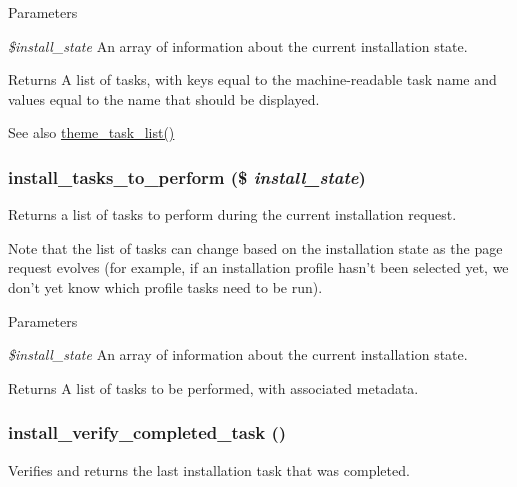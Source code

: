 \begin{DoxyParams}{Parameters}
\item[{\em \$install\_\-state}]An array of information about the current installation state.\end{DoxyParams}
\begin{DoxyReturn}{Returns}
A list of tasks, with keys equal to the machine-\/readable task name and values equal to the name that should be displayed.
\end{DoxyReturn}
\begin{DoxySeeAlso}{See also}
\hyperlink{group__themeable_gacac34ad88b724d01c7ca68f7891f64db}{theme\_\-task\_\-list()} 
\end{DoxySeeAlso}
\hypertarget{install_8core_8inc_a02b255f3c91fa330972d77e41c0b26c4}{
\subsubsection[{install\_\-tasks\_\-to\_\-perform}]{\setlength{\rightskip}{0pt plus 5cm}install\_\-tasks\_\-to\_\-perform (\$ {\em install\_\-state})}}
\label{install_8core_8inc_a02b255f3c91fa330972d77e41c0b26c4}
Returns a list of tasks to perform during the current installation request.

Note that the list of tasks can change based on the installation state as the page request evolves (for example, if an installation profile hasn't been selected yet, we don't yet know which profile tasks need to be run).


\begin{DoxyParams}{Parameters}
\item[{\em \$install\_\-state}]An array of information about the current installation state.\end{DoxyParams}
\begin{DoxyReturn}{Returns}
A list of tasks to be performed, with associated metadata. 
\end{DoxyReturn}
\hypertarget{install_8core_8inc_a0c550ddc08ed7884ffdfc444c85d4a3a}{
\subsubsection[{install\_\-verify\_\-completed\_\-task}]{\setlength{\rightskip}{0pt plus 5cm}install\_\-verify\_\-completed\_\-task ()}}
\label{install_8core_8inc_a0c550ddc08ed7884ffdfc444c85d4a3a}
Verifies and returns the last installation task that was completed.

